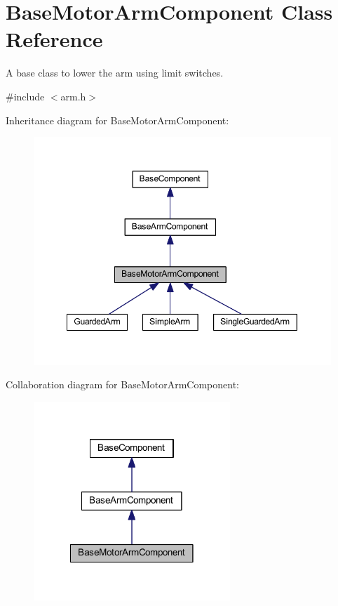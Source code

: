 \hypertarget{class_base_motor_arm_component}{\section{\-Base\-Motor\-Arm\-Component \-Class \-Reference}
\label{class_base_motor_arm_component}
}


\-A base class to lower the arm using limit switches.  




{\ttfamily \#include $<$arm.\-h$>$}



\-Inheritance diagram for \-Base\-Motor\-Arm\-Component\-:\nopagebreak
\begin{figure}[H]
\begin{center}
\leavevmode
\includegraphics[width=350pt]{class_base_motor_arm_component__inherit__graph}
\end{center}
\end{figure}


\-Collaboration diagram for \-Base\-Motor\-Arm\-Component\-:\nopagebreak
\begin{figure}[H]
\begin{center}
\leavevmode
\includegraphics[width=210pt]{class_base_motor_arm_component__coll__graph}
\end{center}
\end{figure}
